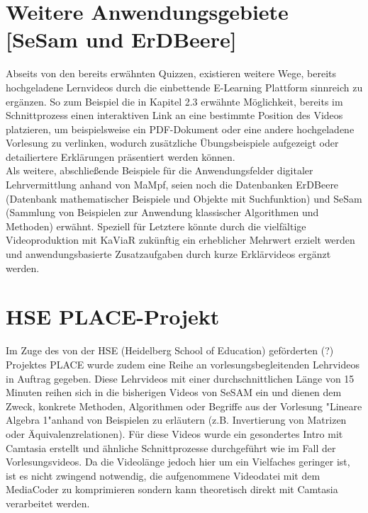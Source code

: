\documentclass{scrreprt}
\begin{document}
\section{Weitere Anwendungsgebiete [SeSam und ErDBeere]}
Abseits von den bereits erwähnten Quizzen, existieren weitere Wege, bereits hochgeladene Lernvideos durch die einbettende E-Learning Plattform sinnreich zu ergänzen. So zum Beispiel die in Kapitel 2.3 erwähnte Möglichkeit, bereits im Schnittprozess einen interaktiven Link an eine bestimmte Position des Videos platzieren, um beispielsweise ein PDF-Dokument oder eine andere hochgeladene Vorlesung zu verlinken, wodurch zusätzliche Übungsbeispiele aufgezeigt oder detailiertere Erklärungen präsentiert werden können.\\
Als weitere, abschließende Beispiele für die Anwendungsfelder digitaler Lehrvermittlung anhand von MaMpf, seien noch die Datenbanken ErDBeere (Datenbank mathematischer Beispiele und Objekte mit Suchfunktion) und SeSam (Sammlung von Beispielen zur Anwendung  klassischer Algorithmen und Methoden) erwähnt. Speziell für Letztere könnte durch die vielfältige Videoproduktion mit KaViaR zukünftig ein erheblicher Mehrwert erzielt werden und anwendungsbasierte Zusatzaufgaben durch kurze Erklärvideos ergänzt werden.
\section{HSE PLACE-Projekt}
Im Zuge des von der HSE (Heidelberg School of Education) geförderten (?) Projektes PLACE wurde zudem eine Reihe an vorlesungsbegleitenden Lehrvideos in Auftrag gegeben. Diese Lehrvideos mit einer durchschnittlichen Länge von 15 Minuten reihen sich in die bisherigen Videos von SeSAM ein und dienen dem Zweck, konkrete Methoden, Algorithmen oder Begriffe aus der Vorlesung "Lineare Algebra 1"anhand von Beispielen zu erläutern (z.B. Invertierung von Matrizen oder Äquivalenzrelationen). Für diese Videos wurde ein gesondertes Intro mit Camtasia erstellt und ähnliche Schnittprozesse durchgeführt wie im Fall der Vorlesungsvideos. Da die Videolänge jedoch hier um ein Vielfaches geringer ist, ist es nicht zwingend notwendig, die aufgenommene Videodatei mit dem MediaCoder zu komprimieren sondern kann theoretisch direkt mit Camtasia verarbeitet werden. 
\end{document}
